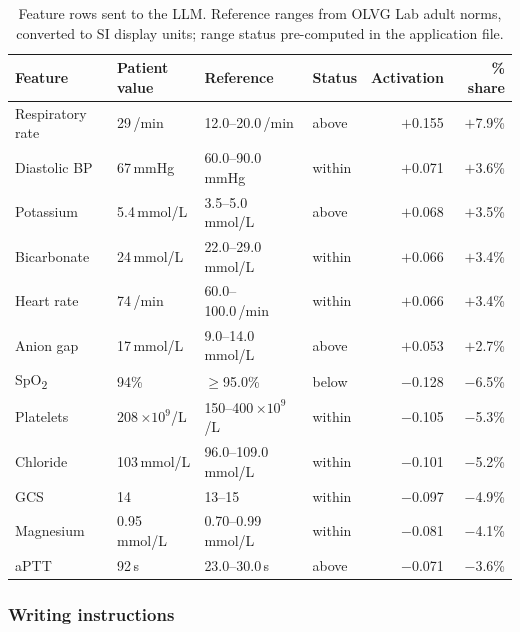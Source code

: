 \documentclass[12pt, a4paper]{article}
\begin{document}
\begin{table}[H]
  \centering
  \footnotesize
  \caption{Feature rows sent to the LLM. Reference ranges from OLVG Lab adult norms, converted to SI display units; range status pre-computed in the application file.}
  \label{tab:llm_features}
  \setlength{\tabcolsep}{3pt}
  \begin{tabular}{llllrr}
    \toprule
    Feature & Patient value & Reference & Status & Activation & \% share \\
    \midrule
    Respiratory rate   & 29\,/min         & 12.0--20.0\,/min       & above    & $+$0.155 & $+$7.9\% \\
    Diastolic BP       & 67\,mmHg         & 60.0--90.0\,mmHg       & within   & $+$0.071 & $+$3.6\% \\
    Potassium          & 5.4\,mmol/L      & 3.5--5.0\,mmol/L       & above    & $+$0.068 & $+$3.5\% \\
    Bicarbonate        & 24\,mmol/L       & 22.0--29.0\,mmol/L     & within   & $+$0.066 & $+$3.4\% \\
    Heart rate         & 74\,/min         & 60.0--100.0\,/min      & within   & $+$0.066 & $+$3.4\% \\
    Anion gap          & 17\,mmol/L       & 9.0--14.0\,mmol/L      & above    & $+$0.053 & $+$2.7\% \\
    \addlinespace
    SpO\textsubscript{2} & 94\%           & $\geq$95.0\%           & below    & $-$0.128 & $-$6.5\% \\
    Platelets          & 208\,$\times10^{9}$/L & 150--400\,$\times10^{9}$/L & within & $-$0.105 & $-$5.3\% \\
    Chloride           & 103\,mmol/L      & 96.0--109.0\,mmol/L    & within   & $-$0.101 & $-$5.2\% \\
    GCS                & 14               & 13--15                 & within   & $-$0.097 & $-$4.9\% \\
    Magnesium          & 0.95\,mmol/L     & 0.70--0.99\,mmol/L     & within   & $-$0.081 & $-$4.1\% \\
    aPTT               & 92\,s            & 23.0--30.0\,s          & above    & $-$0.071 & $-$3.6\% \\
    \bottomrule
  \end{tabular}
\end{table}

\subsubsection*{Writing instructions}
\end{document}
